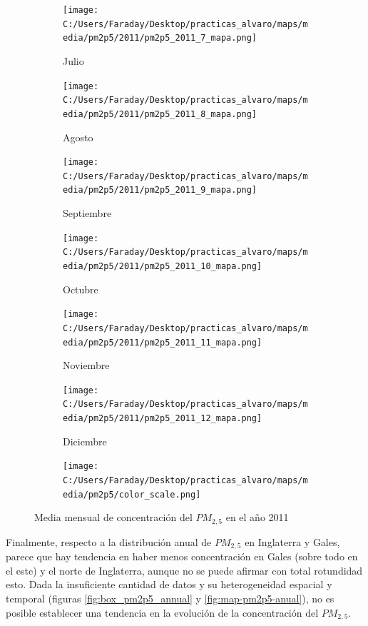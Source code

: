 \documentclass[12pt]{article}
\begin{document}
\begin{figure}[H]
\begin{subfigure}[H]{0.15\textwidth}
\texttt{[image: C:/Users/Faraday/Desktop/practicas\_alvaro/maps/media/pm2p5/2011/pm2p5\_2011\_7\_mapa.png]}
\captionsetup{labelformat=empty}
\caption{Julio}
\label{fig:map-pm2p5-2011-7}
\end{subfigure}
%
\begin{subfigure}[H]{0.15\textwidth}
\texttt{[image: C:/Users/Faraday/Desktop/practicas\_alvaro/maps/media/pm2p5/2011/pm2p5\_2011\_8\_mapa.png]}
\captionsetup{labelformat=empty}
\caption{Agosto}
\label{fig:map-pm2p5-2011-8}
\end{subfigure}
%
\begin{subfigure}[H]{0.15\textwidth}
\texttt{[image: C:/Users/Faraday/Desktop/practicas\_alvaro/maps/media/pm2p5/2011/pm2p5\_2011\_9\_mapa.png]}
\captionsetup{labelformat=empty}
\caption{Septiembre}
\label{fig:map-pm2p5-2011-9}
\end{subfigure}
%
\begin{subfigure}[H]{0.15\textwidth}
\texttt{[image: C:/Users/Faraday/Desktop/practicas\_alvaro/maps/media/pm2p5/2011/pm2p5\_2011\_10\_mapa.png]}
\captionsetup{labelformat=empty}
\caption{Octubre}
\label{fig:map-pm2p5-2011-10}
\end{subfigure}
%
\begin{subfigure}[H]{0.15\textwidth}
\texttt{[image: C:/Users/Faraday/Desktop/practicas\_alvaro/maps/media/pm2p5/2011/pm2p5\_2011\_11\_mapa.png]}
\captionsetup{labelformat=empty}
\caption{Noviembre}
\label{fig:map-pm2p5-2011-11}
\end{subfigure}
%
\begin{subfigure}[H]{0.15\textwidth}
\texttt{[image: C:/Users/Faraday/Desktop/practicas\_alvaro/maps/media/pm2p5/2011/pm2p5\_2011\_12\_mapa.png]}
\captionsetup{labelformat=empty}
\caption{Diciembre}
\label{fig:map-pm2p5-2011-12}
\end{subfigure}

\begin{subfigure}[H]{0.45\textwidth}
\texttt{[image: C:/Users/Faraday/Desktop/practicas\_alvaro/maps/media/pm2p5/color\_scale.png]}
\captionsetup{labelformat=empty}
\caption{}
\end{subfigure}

\vspace*{-7mm}
\caption{Media mensual de concentración del $PM_{2,5}$ en el año 2011}
\label{fig:map-pm2p5-2011}
\end{figure}

Finalmente, respecto a la distribución anual de $PM_{2,5}$ en Inglaterra y Gales, parece que hay tendencia en haber menos concentración en Gales (sobre todo en el este) y el norte de Inglaterra, aunque no se puede afirmar con total rotundidad esto. Dada la insuficiente cantidad de datos y su heterogeneidad espacial y temporal (figuras \ref{fig:box_pm2p5_annual} y \ref{fig:map-pm2p5-anual}), no es posible establecer una tendencia en la evolución de la concentración del $PM_{2,5}$.
\end{document}
